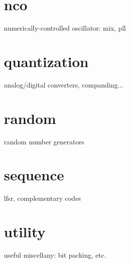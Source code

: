 \documentclass[11pt,twoside]{report}
\begin{document}


\section{nco}
numerically-controlled oscillator: mix, pll



\section{quantization}
analog/digital converters, companding...
\section{random}
random number generators
\section{sequence}
lfsr, complementary codes
\section{utility}
useful miscellany: bit packing, etc. 


%
%
\cleardoublepage
%


\appendix
%
%
\end{document}
